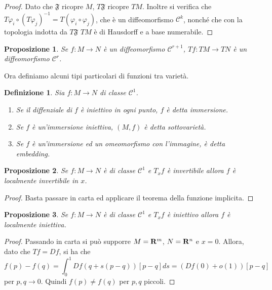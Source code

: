 \documentclass{article}
\newcommand{\PHI}{\varphi}
\newcommand{\composto}{\circ}
\newcommand{\inv}{^{-1}}
\newcommand{\ci}[1]{\mathscr{#1}}%
\newcommand{\g}[1]{\mathfrak{#1}}
\newtheorem{definizione}{ Definizione}
\newtheorem{proposizione}{ Proposizione}
\begin{document}
 \begin{proof}
  Dato che $\g{F}$ ricopre $M$, $T\g{F}$ ricopre $TM$. Inoltre si verifica che $T\PHI_i\composto(T\PHI_j)\inv=T(\PHI_i\composto\PHI_j)$,
  che è un diffeomorfismo $\ci{C}^k$, nonché che con la topologia indotta da $T\g{F}$
  $TM$ è di Hausdorff e a base numerabile.
 \end{proof}

 \begin{proposizione}
  Se $f:M\to N$ è un diffeomorfismo $\ci{C}^{r+1}$, $Tf:TM\to TN$ è un diffeomorfismo $\ci{C}^r$.
 \end{proposizione}

 Ora definiamo alcuni tipi particolari di funzioni tra varietà.
 
 \begin{definizione}
  Sia $f:M\to N$ di classe $\ci{C}^1$.
  \begin{enumerate}[label=\bf\Roman*)]
   \item Se il diffenziale di $f$ è iniettivo in ogni punto, $f$ è detta immersione.
   \item Se $f$ è un'immersione iniettiva, $(M,f)$ è detta sottovarietà.
   \item Se $f$ è un'immersione ed un omeomorfismo con l'immagine, è detta embedding.
  \end{enumerate}
 \end{definizione}

 \begin{proposizione}
  Se $f:M\to N$ è di classe $\ci{C}^1$ e $T_xf$ è invertibile allora $f$ è localmente invertibile in $x$.
 \end{proposizione}

 \begin{proof}
  Basta passare in carta ed applicare il teorema della funzione implicita.
 \end{proof}

 \begin{proposizione}
  Se $f:M\to N$ è di classe $\ci{C}^1$ e $T_xf$ è iniettivo allora $f$ è localmente iniettiva.
 \end{proposizione}

 \begin{proof}
  Passando in carta si può supporre $M={\bf R}^m$, $N={\bf R}^n$ e $x=0$. Allora, dato
  che $Tf=Df$, si ha che
  $$f(p)-f(q)=\int_0^1Df(q+s(p-q))[p-q]ds=(Df(0)+o(1))[p-q]$$
  per $p,q\to 0$. Quindi $f(p)\ne f(q)$ per $p,q$ piccoli.
 \end{proof}
\end{document}
